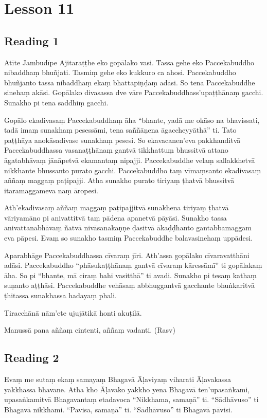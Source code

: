 \chapter{Lesson 11}

\section*{Reading 1}

Atīte Jambudīpe Ajitaraṭṭhe eko gopālako vasi. Tassa gehe eko Paccekabuddho nibaddhaṃ bhuñjati. Tasmiṃ gehe eko kukkuro ca ahosi. Paccekabuddho bhuñjanto tassa nibaddhaṃ ekaṃ bhattapiṇḍaṃ adāsi. So tena Paccekabuddhe sinehaṃ akāsi. Gopālako divasassa dve vāre Paccekabuddhass’upaṭṭhānaṃ gacchi. Sunakho pi tena saddhiṃ gacchi.

Gopālo ekadivasaṃ Paccekabuddhaṃ āha “bhante, yadā me okāso na bhavissati, tadā imaṃ sunakhaṃ pesessāmi, tena saññāṇena āgaccheyyāthā” ti. Tato paṭṭhāya anokāsadivase sunakhaṃ pesesi. So ekavacanen’eva pakkhanditvā Paccekabuddhassa vasanaṭṭhānaṃ gantvā tikkhattuṃ bhussitvā attano āgatabhāvaṃ jānāpetvā ekamantaṃ nipajji. Paccekabuddhe velaṃ sallakkhetvā nikkhante bhussanto purato gacchi. Paccekabuddho taṃ vīmaṃsanto ekadivasaṃ aññaṃ maggaṃ paṭipajji. Atha sunakho purato tiriyaṃ ṭhatvā bhussitvā itaramaggameva naṃ āropesi.

Ath’ekadivasaṃ aññaṃ maggaṃ paṭipajjitvā sunakhena tiriyaṃ ṭhatvā vāriyamāno pi anivattitvā taṃ pādena apanetvā pāyāsi. Sunakho tassa anivattanabhāvaṃ ñatvā nivāsanakaṇṇe ḍasitvā ākaḍḍhanto gantabbamaggam eva pāpesi. Evaṃ so sunakho tasmiṃ Paccekabuddhe balavasinehaṃ uppādesi.

Aparabhāge Paccekabuddhassa cīvaraṃ jīri. Ath’assa gopālako cīvaravatthāni adāsi. Paccekabuddho “phāsukaṭṭhānaṃ gantvā cīvaraṃ kāressāmī” ti gopālakaṃ āha. So pi “bhante, mā ciraṃ bahi vasitthā” ti avadi. Sunakho pi tesaṃ kathaṃ suṇanto aṭṭhāsi. Paccekabuddhe vehāsaṃ abbhuggantvā gacchante bhuṅkaritvā ṭhitassa sunakhassa hadayaṃ phali.

Tiracchānā nām’ete ujujātikā honti akuṭilā.

Manussā pana aññaṃ cintenti, aññaṃ vadanti. (Rasv)

\section*{Reading 2}

Evaṃ me sutaṃ ekaṃ samayaṃ Bhagavā Āḷaviyaṃ viharati Āḷavakassa yakkhassa bhavane. Atha kho Āḷavako yakkho yena Bhagavā ten’upasaṅkami, upasaṅkamitvā Bhagavantaṃ etadavoca “Nikkhama, samaṇā” ti. “Sādhāvuso” ti Bhagavā nikkhami. “Pavisa, samaṇā” ti. “Sādhāvuso” ti Bhagavā pāvisi.

